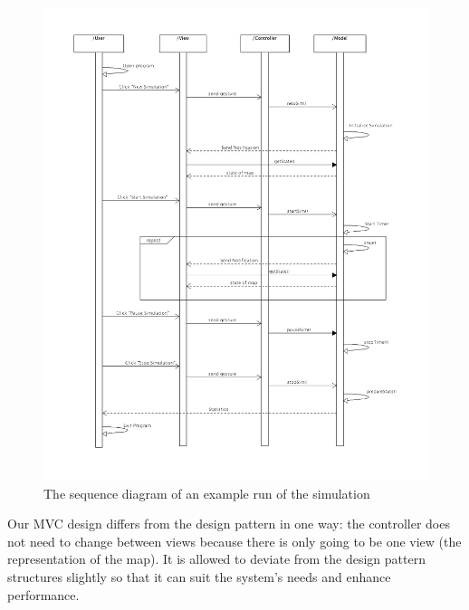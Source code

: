 \documentclass{article}
\begin{document}
   	\begin{figure}
   		\vspace{-35pt}
   		\centering
   		\includegraphics[width=1.15\textwidth]{SequenceDiagram}
   		\caption{The sequence diagram of an example run of the simulation}
   		\label{SequenceDiagram}
   	\end{figure}
   	

%

   Our MVC design differs from the design pattern in one way: the controller does not need to change between views because there is only going to be one view (the representation of the map). 
   It is allowed to deviate from the design pattern structures slightly so that it can suit the system's needs and enhance performance. 
   
\end{document}

